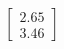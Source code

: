 \documentclass[preview]{standalone}
\begin{document}
\begin{align*}
\begin{bmatrix} 2.65 \\ 3.46 \end{bmatrix}
\end{align*}
\end{document}
